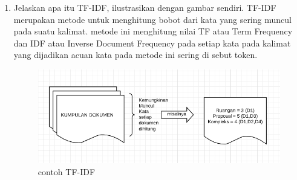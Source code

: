 \begin{enumerate}
\item Jelaskan apa itu TF-IDF, ilustrasikan dengan gambar sendiri.
 TF-IDF merupakan metode untuk menghitung bobot dari kata yang sering muncul pada suatu kalimat. metode ini menghitung nilai TF atau Term Frequency dan IDF atau Inverse Document Frequency pada setiap kata pada kalimat yang dijadikan acuan kata pada metode ini sering di sebut token.
 
\begin{figure}[ht]
\centering
\includegraphics[scale=0.2]{figures/1174002/4/5.PNG}
\caption{contoh TF-IDF}
\label{contoh}
\end{figure}

\end{enumerate}

